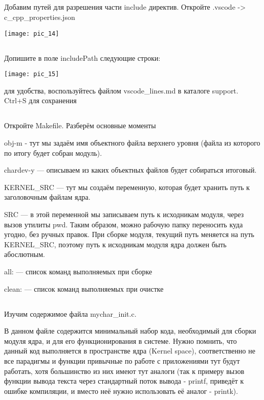 \subsection{}Добавим путей для разрешения части include директив. Откройте .vscode -> c\_cpp\_properties.json
\begin{center}
	\texttt{[image: pic\_14]}
\end{center}

\subsection{}Допишите в поле includePath следующие строки:\\
\begin{center}
	\texttt{[image: pic\_15]}
\end{center}
для удобства, воспользуйтесь файлом vscode\_lines.md в каталоге support. Ctrl+S для сохранения

\subsection{}Откройте Makefile. Разберём основные моменты

obj-m  - тут мы задаём имя объектного файла верхнего уровня (файла из которого по итогу будет собран модуль). 

chardev-y — описываем из каких объектных файлов будет собираться итоговый. 

KERNEL\_SRC — тут мы создаём переменную, которая будет хранить путь к заголовочным файлам ядра.

SRC — в этой переменной мы записываем путь к исходникам модуля, через вызов утилиты pwd. Таким образом, можно рабочую папку переносить куда угодно, без ручных правок. При сборке модуля, текущий путь меняется на путь KERNEL\_SRC, поэтому путь к исходникам модуля ядра должен быть абослютным.

all: — список команд выполняемых при сборке 

clean: — список команд выполняемых при очистке

\subsection{}Изучим содержимое файла mychar\_init.c.

В данном файле содержится минимальный набор кода, необходимый для сборки модуля ядра, и для его функционирования в системе. Нужно помнить, что данный код выполняется в пространстве ядра (Kernel space), соответственно не все парадигмы и функции привычные по работе с приложениями тут будут работать, хотя большинство из них имеют тут аналоги (так к примеру вызов функции вывода текста через стандартный поток вывода - printf, приведёт к ошибке компиляции, и вместо неё нужно использовать её аналог - printk).

